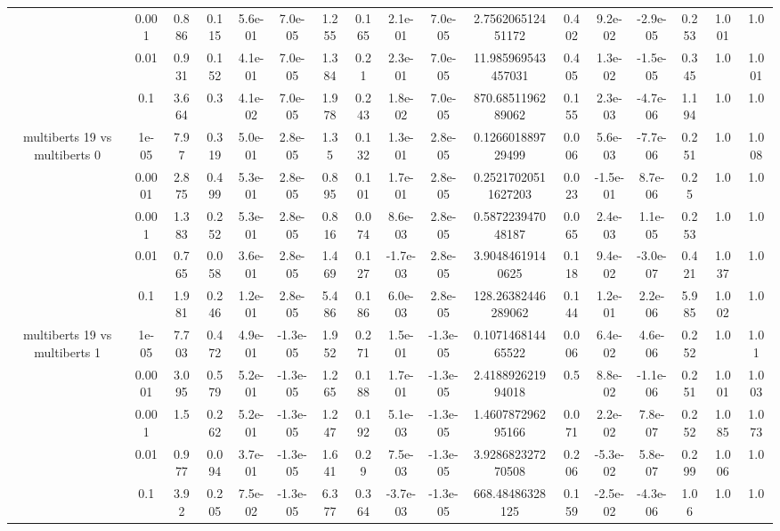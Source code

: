 \begin{tabular}{|c|c|c|c|c|c|c|c|c|c|c|c|c|c|c|c|c|}
 & 0.001 & 0.886 & 0.115 & 5.6e-01 & 7.0e-05 & 1.255 & 0.165 & 2.1e-01 & 7.0e-05 & 2.756206512451172 & 0.402 & 9.2e-02 & -2.9e-05 & 0.253 & 1.001 & 1.0 \\
 & 0.01 & 0.931 & 0.152 & 4.1e-01 & 7.0e-05 & 1.384 & 0.21 & 2.3e-01 & 7.0e-05 & 11.985969543457031 & 0.405 & 1.3e-02 & -1.5e-05 & 0.345 & 1.0 & 1.001 \\
 & 0.1 & 3.664 & 0.3 & 4.1e-02 & 7.0e-05 & 1.978 & 0.243 & 1.8e-02 & 7.0e-05 & 870.6851196289062 & 0.155 & 2.3e-03 & -4.7e-06 & 1.194 & 1.0 & 1.0 \\
\hline
\multirow{5}{*}{multiberts 19 vs multiberts 0} & 1e-05 & 7.97 & 0.319 & 5.0e-01 & 2.8e-05 & 1.35 & 0.132 & 1.3e-01 & 2.8e-05 & 0.126601889729499 & 0.006 & 5.6e-03 & -7.7e-06 & 0.251 & 1.0 & 1.008 \\
 & 0.0001 & 2.875 & 0.499 & 5.3e-01 & 2.8e-05 & 0.895 & 0.101 & 1.7e-01 & 2.8e-05 & 0.25217020511627203 & 0.023 & -1.5e-01 & 8.7e-06 & 0.25 & 1.0 & 1.0 \\
 & 0.001 & 1.383 & 0.252 & 5.3e-01 & 2.8e-05 & 0.816 & 0.074 & 8.6e-03 & 2.8e-05 & 0.587223947048187 & 0.065 & 2.4e-03 & 1.1e-05 & 0.253 & 1.0 & 1.0 \\
 & 0.01 & 0.765 & 0.058 & 3.6e-01 & 2.8e-05 & 1.469 & 0.127 & -1.7e-03 & 2.8e-05 & 3.90484619140625 & 0.118 & 9.4e-02 & -3.0e-07 & 0.421 & 1.037 & 1.0 \\
 & 0.1 & 1.981 & 0.246 & 1.2e-01 & 2.8e-05 & 5.486 & 0.186 & 6.0e-03 & 2.8e-05 & 128.26382446289062 & 0.144 & 1.2e-01 & 2.2e-06 & 5.985 & 1.002 & 1.0 \\
\hline
\multirow{5}{*}{multiberts 19 vs multiberts 1} & 1e-05 & 7.703 & 0.472 & 4.9e-01 & -1.3e-05 & 1.952 & 0.271 & 1.5e-01 & -1.3e-05 & 0.107146814465522 & 0.006 & 6.4e-02 & 4.6e-06 & 0.252 & 1.0 & 1.01 \\
 & 0.0001 & 3.095 & 0.579 & 5.2e-01 & -1.3e-05 & 1.265 & 0.188 & 1.7e-01 & -1.3e-05 & 2.418892621994018 & 0.5 & 8.8e-02 & -1.1e-06 & 0.251 & 1.001 & 1.003 \\
 & 0.001 & 1.5 & 0.262 & 5.2e-01 & -1.3e-05 & 1.247 & 0.192 & 5.1e-03 & -1.3e-05 & 1.460787296295166 & 0.071 & 2.2e-02 & 7.8e-07 & 0.252 & 1.085 & 1.073 \\
 & 0.01 & 0.977 & 0.094 & 3.7e-01 & -1.3e-05 & 1.641 & 0.29 & 7.5e-03 & -1.3e-05 & 3.928682327270508 & 0.206 & -5.3e-02 & 5.8e-07 & 0.299 & 1.006 & 1.0 \\
 & 0.1 & 3.92 & 0.205 & 7.5e-02 & -1.3e-05 & 6.377 & 0.364 & -3.7e-03 & -1.3e-05 & 668.48486328125 & 0.159 & -2.5e-02 & -4.3e-06 & 1.06 & 1.0 & 1.0 \\

\end{tabular}
